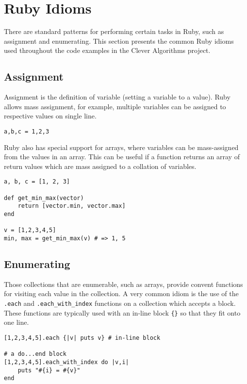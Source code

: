 % 
% 
\section*{Ruby Idioms}
There are standard patterns for performing certain tasks in Ruby, such as assignment and enumerating. This section presents the common Ruby idioms used throughout the code examples in the Clever Algorithms project.

\subsection{Assignment}
Assignment is the definition of variable (setting a variable to a value). Ruby allows mass assignment, for example, multiple variables can be assigned to respective values on single line.

\begin{lstlisting}
a,b,c = 1,2,3
\end{lstlisting}

Ruby also has special support for arrays, where variables can be mass-assigned from the values in an array. This can be useful if a function returns an array of return values which are mass assigned to a collation of variables.

\begin{lstlisting}
a, b, c = [1, 2, 3]

def get_min_max(vector)
	return [vector.min, vector.max]
end

v = [1,2,3,4,5]
min, max = get_min_max(v) # => 1, 5
\end{lstlisting}

\subsection{Enumerating}
Those collections that are enumerable, such as arrays, provide convent functions for visiting each value in the collection. A very common idiom is the use of the \texttt{.each} and \texttt{.each\_with\_index} functions on a collection which accepts a block. These functions are typically used with an in-line block \texttt{\{\}} so that they fit onto one line.

\begin{lstlisting}
[1,2,3,4,5].each {|v| puts v} # in-line block

# a do...end block
[1,2,3,4,5].each_with_index do |v,i|
	puts "#{i} = #{v}"
end
\end{lstlisting}

